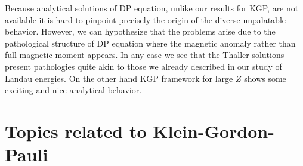 Because analytical solutions of DP equation, unlike our results for KGP, are not available it is hard to pinpoint precisely the origin of the diverse unpalatable behavior. However, we can hypothesize that the problems arise due to the pathological structure of DP equation where the magnetic anomaly rather than full magnetic moment appears. In any case we see that the Thaller solutions present pathologies quite akin to those we already described in our study of Landau energies. On the other hand KGP framework for large $Z$ shows some exciting and nice analytical behavior.

\section{Topics related to Klein-Gordon-Pauli}
\label{sec:kgptopics}
